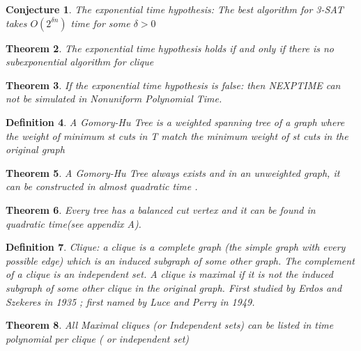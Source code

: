 \documentclass[12pt]{article}
\newtheorem{thm}{Theorem}[section]
\newtheorem{conj}[thm]{Conjecture}
\newtheorem{mydef}[thm]{Definition}
\begin{document}
\begin{conj}\cite[abstract and theorem 1]{IMPAGLIAZZO2000} The exponential time hypothesis: The best algorithm for 3-SAT takes $ O(2^{\delta n}) $ time for some $\delta > 0 $\end{conj}

\begin{thm}\cite[Theorem 5.5]{CHEN2006} \label{cliquebound} The exponential time hypothesis holds if and only if there is no subexponential algorithm for clique \end{thm}

\begin{thm}\label{complexity} If the exponential time hypothesis is false: then NEXPTIME can not be simulated in Nonuniform Polynomial Time.\end{thm}

\begin{mydef}\label{GHt}\cite{kolmogorov2022} \cite{GomoryHu1961} A Gomory-Hu Tree is a weighted spanning tree of a graph where the weight of minimum st cuts in T match the minimum weight of st cuts in the original graph\end{mydef}

\begin{thm} \label{GH} A Gomory-Hu Tree always exists \cite{GomoryHu1961} and in an unweighted graph, it can be constructed in almost quadratic time \cite{Abbound2021}.\end{thm}

\begin{thm}\label{CT} Every tree has a balanced cut vertex\cite{Jordan1869} and it can be found in quadratic time(see appendix A).\end{thm}

\begin{mydef} Clique: a clique is a complete graph (the simple graph with every possible edge) which is an induced subgraph of some other graph. The complement of a clique is an independent set. A clique is maximal if it is not the induced subgraph of some other clique in the original graph. First studied by Erdos and Szekeres in 1935 \cite{ErdosANDszekeres1935}; first named by Luce and Perry in 1949.\cite{LuceANDPerry1949}\end{mydef}

\begin{thm}  \cite{TsukiyamaETAL1977} All Maximal cliques (or Independent sets) can be listed in time polynomial per clique ( or independent set)\end{thm} 
\end{document}
